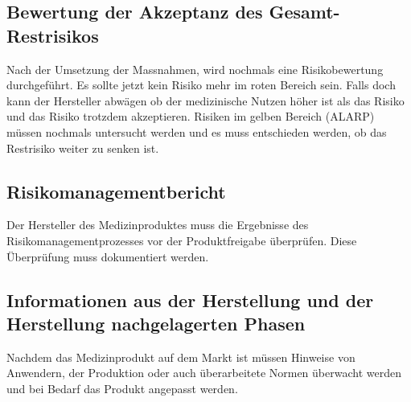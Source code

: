 \subsection{Bewertung der Akzeptanz des Gesamt-Restrisikos}

Nach der Umsetzung der Massnahmen, wird nochmals eine Risikobewertung durchgeführt. Es sollte jetzt kein Risiko mehr im roten Bereich sein. Falls doch kann der Hersteller abwägen ob der medizinische Nutzen höher ist als das Risiko und das Risiko trotzdem akzeptieren. Risiken im gelben Bereich (ALARP) müssen nochmals untersucht werden und es muss entschieden werden, ob das Restrisiko weiter zu senken ist.

\subsection{Risikomanagementbericht}

Der Hersteller des Medizinproduktes muss die Ergebnisse des Risikomanagementprozesses vor der Produktfreigabe überprüfen. Diese Überprüfung muss dokumentiert werden.

\subsection{Informationen aus der Herstellung und der Herstellung nachgelagerten Phasen}

Nachdem das Medizinprodukt auf dem Markt ist müssen Hinweise von Anwendern, der Produktion oder auch überarbeitete Normen überwacht werden und bei Bedarf das Produkt angepasst werden.